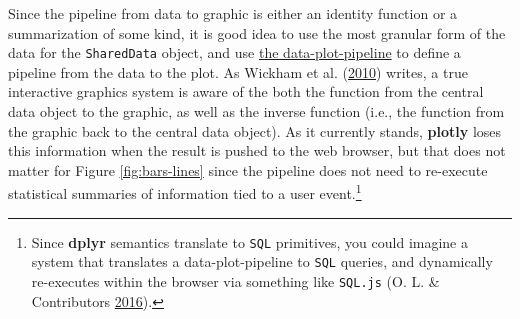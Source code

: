 \documentclass[12pt,]{isuthesis}
\let\rmarkdownfootnote\footnote%
\def\footnote{\protect\rmarkdownfootnote}
\begin{document}
Since the pipeline from data to graphic is either an identity function
or a summarization of some kind, it is good idea to use the most
granular form of the data for the \texttt{SharedData} object, and use
\protect\hyperlink{the-data-plot-pipeline}{the data-plot-pipeline} to
define a pipeline from the data to the plot. As Wickham et al.
(\protect\hyperlink{ref-plumbing}{2010}) writes, a true interactive
graphics system is aware of the both the function from the central data
object to the graphic, as well as the inverse function (i.e., the
function from the graphic back to the central data object). As it
currently stands, \textbf{plotly} loses this information when the result
is pushed to the web browser, but that does not matter for Figure
\ref{fig:bars-lines} since the pipeline does not need to re-execute
statistical summaries of information tied to a user event.\footnote{Since
  \textbf{dplyr} semantics translate to \texttt{SQL} primitives, you
  could imagine a system that translates a data-plot-pipeline to
  \texttt{SQL} queries, and dynamically re-executes within the browser
  via something like \texttt{SQL.js} (O. L. \& Contributors
  \protect\hyperlink{ref-SQLjs}{2016}).}
\end{document}
